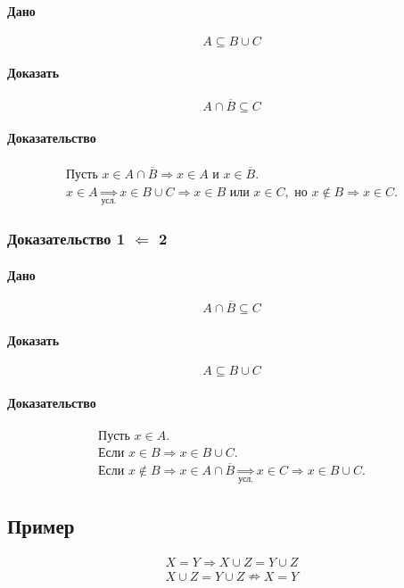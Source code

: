 \documentclass{article}
\begin{document}
\paragraph{Дано}
\[
    A \subseteq B \cup C
\]

\paragraph{Доказать}
\[
    A \cap \overline{B} \subseteq C
\]

\paragraph{Доказательство}
\begin{gather*}
    \text{Пусть } x \in A \cap \overline{B} \Rightarrow x \in A \text{ и } x \in \overline B. \\
    x \in A \underset{\text{усл.}}{\Rightarrow} x \in B \cup C \Rightarrow x \in B \text{ или } x \in C, \text{ но } x \notin B \Rightarrow x \in C.
\end{gather*}


\subsubsection{Доказательство 1 $\Leftarrow$ 2}
\paragraph{Дано}
\[
    A \cap \overline{B} \subseteq C
\]

\paragraph{Доказать}
\[
    A \subseteq B \cup C
\]

\paragraph{Доказательство}
\begin{gather*}
    \text{Пусть } x \in A. \\
    \text{Если } x \in B \Rightarrow x \in B \cup C. \\
    \text{Если } x \notin B \Rightarrow x \in A \cap \overline B \underset{\text{усл.}}{\Rightarrow} x \in C \Rightarrow x \in B \cup C.
\end{gather*}


\subsection{Пример}
\begin{gather*}
    X = Y \Rightarrow X \cup Z = Y \cup Z \\
    X \cup Z = Y \cup Z \nRightarrow X = Y
\end{gather*}
\end{document}
